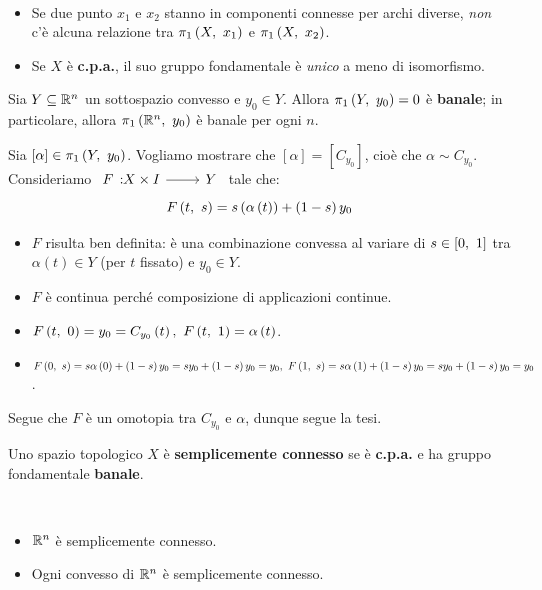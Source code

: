 \begin{observe}~{}
	\begin{itemize}
		\item Se due punto $x_1$ e $x_2$ stanno in componenti connesse per archi diverse, \textit{non} c'è alcuna relazione tra $\gruf{X}{x_1}$ e $\gruf{X}{x_2}$.
		\item Se $X$ è \textbf{c.p.a.}, il suo gruppo fondamentale è \textit{unico} a meno di isomorfismo.
	\end{itemize}
\end{observe}
\begin{example}
	Sia $Y\subseteq \mathbb{R}^n$ un sottospazio convesso e $y_0\in Y$.
	Allora $\gruf{Y}{y_0}=0$ è \textbf{banale}; in particolare, allora $\gruf{\realset^n}{y_0}$ è banale per ogni $n$.
\end{example}
\begin{demonstration}
	Sia $\left[\alpha\right]\in\gruf{Y}{y_0}$. Vogliamo mostrare che $\left[\alpha\right]=\left[C_{y_0}\right]$, cioè che $\alpha\sim C_{y_0}$.\\
	Consideriamo $\funz{F}{X\times I}{Y}$ tale che:
	\begin{equation*}
		F\left(t,\ s\right)=s\left(\alpha\left(t\right)\right)+\left(1-s\right)y_0
	\end{equation*}
\begin{itemize}
	\item $F$ risulta ben definita: è una combinazione convessa al variare di $s\in\left[0,\ 1\right]$ tra $\alpha\left(t\right)\in Y$ (per $t$ fissato) e $y_0\in Y$.
	\item $F$ è continua perché composizione di applicazioni continue.
	\item $\mvf{F}{t}{0}=y_0=C_{y_0}\left(t\right),\ \mvf{F}{t}{1}=\alpha\left(t\right)$.
	\item $\mvf{F}{0}{s}=s\alpha\left(0\right)+\left(1-s\right)y_0=sy_0+\left(1-s\right)y_0=y_0,\ \mvf{F}{1}{s}=s\alpha\left(1\right)+\left(1-s\right)y_0=sy_0+\left(1-s\right)y_0=y_0$.
\end{itemize}
Segue che $F$ è un omotopia tra $C_{y_0}$ e $\alpha$, dunque segue la tesi.
\end{demonstration}
\begin{define}
	Uno spazio topologico $X$ è \textbf{semplicemente connesso} se è \textbf{c.p.a.} e ha gruppo fondamentale \textbf{banale}.
\end{define}
\begin{examples}~{}
	\begin{itemize}
		\item $\mathbb{R}^n$ è semplicemente connesso.
		\item Ogni convesso di $\mathbb{R}^n$ è semplicemente connesso.
	\end{itemize}
\end{examples}
